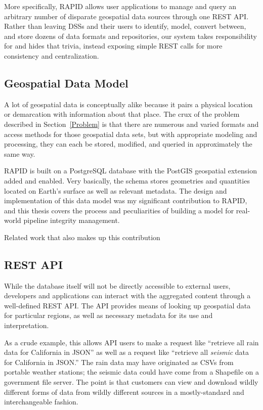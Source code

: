 More specifically, RAPID allows user applications to manage and query an arbitrary number of disparate geospatial data sources through one REST API. Rather than leaving DSSs and their users to identify, model, convert between, and store dozens of data formats and repositories, our system takes responsibility for and hides that trivia, instead exposing simple REST calls for more consistency and centralization.

\subsection{Geospatial Data Model}
A lot of geospatial data is conceptually alike because it pairs a physical location or demarcation with information about that place. The crux of the problem described in Section~\ref{Problem} is that there are numerous and varied formats and access methods for those geospatial data sets, but with appropriate modeling and processing, they can each be stored, modified, and queried in approximately the same way.

RAPID is built on a PostgreSQL database with the PostGIS geospatial extension added and enabled. Very basically, the schema stores geometries and quantities located on Earth's surface as well as relevant metadata. The design and implementation of this data model was my significant contribution to RAPID, and this thesis covers the process and peculiarities of building a model for real-world pipeline integrity management.

Related work that also makes up this contribution 

\subsection{REST API}
While the database itself will not be directly accessible to external users, developers and applications can interact with the aggregated content through a well-defined REST API. The API provides means of looking up geospatial data for particular regions, as well as necessary metadata for its use and interpretation.

As a crude example, this allows API users to make a request like ``retrieve all rain data for California in JSON'' as well as a request like ``retrieve all \textit{seismic} data for California in JSON.'' The rain data may have originated as CSVs from portable weather stations; the seismic data could have come from a Shapefile on a government file server. The point is that customers can view and download wildly different forms of data from wildly different sources in a mostly-standard and interchangeable fashion.

